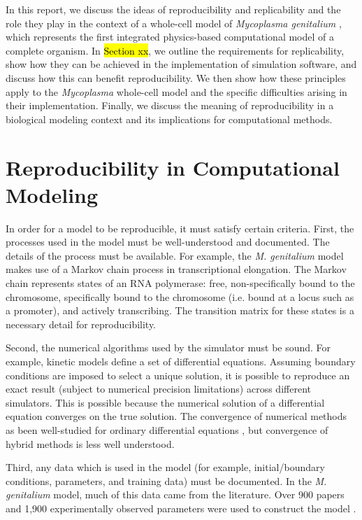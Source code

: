 \documentclass[journal,transmag]{IEEEtran}
\begin{document}
In this report, we discuss the ideas of reproducibility and replicability and
the role they play in the context of a whole-cell model of \textit{Mycoplasma genitalium}
\cite{Karr2012},
which represents the first integrated physics-based computational model of a complete organism.
In \hl{Section xx}, we outline the requirements for replicability, show how they can
be achieved in the implementation of simulation software, and discuss how this can benefit
reproducibility. We then show how these principles apply to the \textit{Mycoplasma} whole-cell
model and the specific difficulties arising in their implementation.
Finally, we discuss the meaning of reproducibility in a biological modeling context
and its implications for computational methods.

\section{Reproducibility in Computational Modeling}

In order for a model to be reproducible, it must satisfy certain criteria.
First, the processes used in the model must be well-understood and documented.
The details of the process must be available.
For example, the \textit{M. genitalium} model makes use of a Markov chain process in
transcriptional elongation. The Markov chain represents states of an RNA polymerase:
free, non-specifically bound to the chromosome, specifically bound to
the chromosome (i.e. bound at a locus such as a promoter), and actively transcribing.
The transition matrix for these states is a necessary detail for reproducibility.

Second, the numerical algorithms used by the simulator must be sound.
For example, kinetic models define a set of differential equations.
Assuming boundary conditions are imposed to select a unique solution,
it is possible to reproduce an exact result (subject to numerical precision limitations)
across different simulators.
This is possible because the numerical solution of a differential equation
converges on the true solution.
The convergence of numerical methods as been well-studied for ordinary differential
equations \cite{brenan1996numerical}, but convergence of hybrid methods is less well understood.

Third, any data which is used in the model (for example, initial/boundary conditions, parameters, and training data)
must be documented.
In the \textit{M. genitalium} model, much of this data came from the literature.
Over 900 papers and 1,900 experimentally observed parameters were used to construct the model \cite{Karr2012}.
\end{document}
